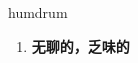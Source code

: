 
\begin{frame}
{\huge humdrum}
\begin{center}
\begin{enumerate}\Large
  \item \textbf{无聊的，乏味的}
\end{enumerate}
\end{center}
\end{frame}
